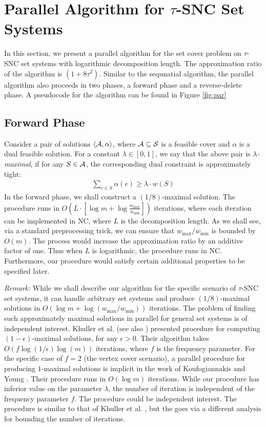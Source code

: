 \documentclass[11pt]{article}
\newcommand{\calA} {{\cal A}}
\newcommand{\calS} {{\cal S}}
\newcommand{\pair}[2] {\langle #1, #2\rangle}
\begin{document}
\section{Parallel Algorithm for $\tau$-SNC Set Systems}
\label{sec:main}
In this section, we present a parallel algorithm for the set cover problem on $\tau$-SNC set systems with logarithmic decomposition length.
The approximation ratio of the algorithm is $(1+8\tau^2)$.
Similar to the sequnatial algorithm, the parallel algorithm also proceeds in two phases, a forward phase and a reverse-delete phase.
A pseudocode for the algorithm can be found in Figure \ref{fig:par}

\subsection{Forward Phase}
Consider a pair of solutions $\pair{\calA}{\alpha}$,
where $\calA\subseteq \calS$ is a feasible cover and $\alpha$ is a dual feasible solution.
For a constant $\lambda\in [0,1]$, we say that the above pair is {\em $\lambda$-maximal},
if for any $S\in \calA$, the corresponding dual constraint is approximately tight:
\begin{eqnarray}
\label{eqn:DDD}
\sum_{e\in S} \alpha(e)  \geq  \lambda \cdot w(S)
\end{eqnarray}
In the forward phase, we shall construct a $(1/8)$-maximal solution.
The procedure runs in $O(L\cdot [\log m + \log \frac{w_{\max}}{w_{\min}}])$ iterations,
where each iteration can be implemented in NC, where $L$ is the decomposition length.
As we shall see, via a standard preprocessing trick, we can ensure that $w_{\max}/w_{\min}$ is 
bounded by $O(m)$. The process would increase the approximation ratio by an additive factor of one.
Thus when $L$ is logarithmic, the procedure runs in NC.
Furthermore, our procedure would satisfy certain additional properties to be specified later. 

{\it Remark: }
While we shall describe our algorithm for the specific scenario of $\tau$-SNC set systems,
it can handle arbitrary set systems and produce $(1/8)$-maximal solutions
in $O(\log m + \log(w_{\max}/w_{\min}))$ iterations.
The problem of finding such approximately maximal solutions in parallel for general set systems is of independent interest.
Khuller et al.\cite{KVY} (see also \cite{Gandhi}) presented procedure for computing $(1-\epsilon)$-maximal solutions, 
for any $\epsilon>0$.  Their algorithm takes $O(f\log(1/\epsilon)\log(m))$ iterations, where $f$ is the frequency parameter.
For the specific case of $f=2$ (the vertex cover scenario),
a parallel procedure for producing $1$-maximal solutions is implicit in the work of 
Koufogiannakis and Young \cite{Kouf-Young}.
Their procedure runs in $O(\log m)$ iterations.
While our procedure has inferior value on the parameter $\lambda$, the number of iteration is independent of the frequency parameter $f$.
The procedure could be independent interest.
The procedure is similar to that of Khuller et al. \cite{KVY}, but the goes via a different analysis for bounding the number of iterations.
\end{document}
